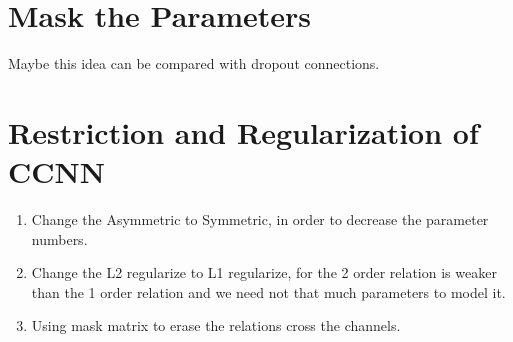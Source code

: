 \documentclass[12pt]{article}
\begin{document}
\section{Mask the Parameters}
Maybe this idea can be compared with dropout connections.

\section{Restriction and Regularization of CCNN}
\begin{enumerate}
    \item Change the Asymmetric to Symmetric, in order to decrease the parameter numbers.
    \item Change the L2 regularize to L1 regularize, for the 2 order relation is weaker than the 1 order relation and we need not that much parameters to model it.
    \item Using mask matrix to erase the relations cross the channels.
\end{enumerate}
\end{document}
